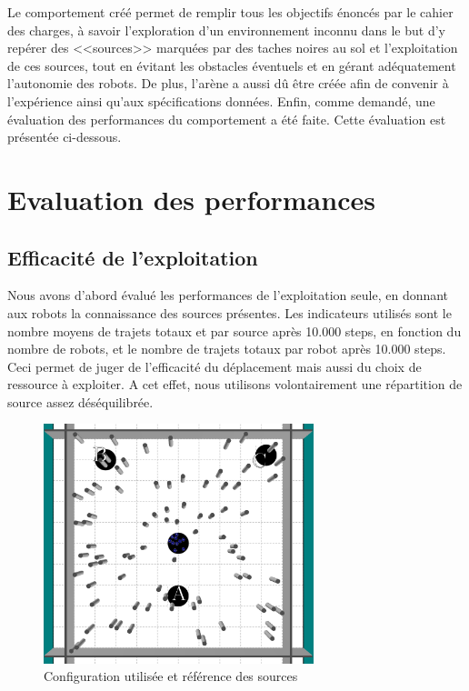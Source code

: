 Le comportement créé permet de remplir tous les objectifs énoncés par le cahier des charges, à savoir l'exploration d'un environnement inconnu dans le but d'y repérer des <<sources>> marquées par des taches noires au sol et l'exploitation de ces sources, tout en évitant les obstacles éventuels et en gérant adéquatement l'autonomie des robots. De plus, l'arène a aussi dû être créée afin de convenir à l'expérience ainsi qu'aux spécifications données. Enfin, comme demandé, une évaluation des performances du comportement a été faite. Cette évaluation est présentée ci-dessous.

\section{Evaluation des performances}

\subsection{Efficacité de l'exploitation}

Nous avons d'abord évalué les performances de l'exploitation seule, en donnant aux robots la connaissance des sources présentes. Les indicateurs utilisés sont le nombre moyens de trajets totaux et par source après 10.000 steps, en fonction du nombre de robots, et le nombre de trajets totaux par robot après 10.000 steps. Ceci permet de juger de l'efficacité du déplacement mais aussi du choix de ressource à exploiter. A cet effet, nous utilisons volontairement une répartition de source assez déséquilibrée.
\begin{figure}[htbp]
  \centering
  \includegraphics[width=0.7\textwidth]{pics/initArenaNames.png}
  \caption{Configuration utilisée et référence des sources}
\end{figure}

